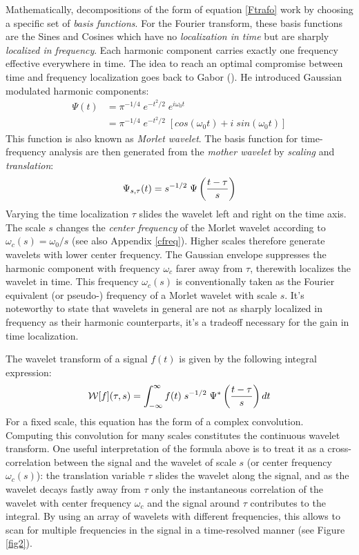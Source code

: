 Mathematically, decompositions of the form of equation \ref{Ftrafo} work by choosing a specific set of \textit{basis functions}. For the Fourier transform, these basis functions are the Sines and Cosines which have no \textit{localization in time} but are sharply \textit{localized in frequency}. Each harmonic component carries exactly one frequency effective everywhere in time. The idea to reach an optimal compromise between time and frequency localization goes back to Gabor (\cite{Gabor1946}). He introduced Gaussian modulated harmonic components:
\begin{align}
  \Psi(t) &= \pi^{-1/4} \; e^{-t^2/2} \; e^{i\omega_0 t}\\
  &= \pi^{-1/4} \; e^{-t^2/2} \; \left[cos(\omega_0 t) + i\; sin(\omega_0 t) \right]
\end{align}
This function is also known as \textit{Morlet wavelet}. The basis function for time-frequency analysis are then generated from the \textit{mother wavelet} by \textit{scaling} and \textit{translation}:
\begin{equation}
  \Psi_{s,\tau}(t) = s^{-1/2}\;\Psi \left(\frac{t - \tau}{s}\right)
\end{equation}
Varying the time localization $\tau$ slides the wavelet left and right on the time axis. The scale $s$ changes the \textit{center frequency} of the Morlet wavelet according to $\omega_c(s) = \omega_0/s$ (see also Appendix \ref{cfreq}). Higher scales therefore generate wavelets with lower center frequency. The Gaussian envelope suppresses the harmonic component with frequency $\omega_c$ farer away from $\tau$, therewith localizes the wavelet in time. This frequency $\omega_c(s)$ is conventionally taken as the Fourier equivalent (or pseudo-) frequency of a Morlet wavelet with scale $s$. It's noteworthy to state that wavelets in general are not as sharply localized in frequency as their harmonic counterparts, it's a tradeoff necessary for the gain in time localization.

The wavelet transform of a signal $f(t)$ is given by the following integral expression:
\begin{equation}
\label{Wtrafo}
\mathcal{W}[f](\tau, s) = \int_{-\infty}^{\infty} f(t) \; s^{-1/2} \;
                    \Psi^* \left(\frac{t - \tau}{s} \right) dt
\end{equation}    
For a fixed scale, this equation has the form of a complex convolution. Computing this convolution for many scales constitutes the continuous wavelet transform. One useful interpretation of the formula above is to treat it as a cross-correlation between the signal and the wavelet of scale $s$ (or center frequency $\omega_c(s)$): the translation variable $\tau$ slides the wavelet along the signal, and as the wavelet decays fastly away from $\tau$ only the instantaneous correlation of the wavelet with center frequency $\omega_c$ and the signal around $\tau$ contributes to the integral. By using an array of wavelets with different frequencies, this allows to scan for multiple frequencies in the signal in a time-resolved manner (see Figure \ref{fig2}).

